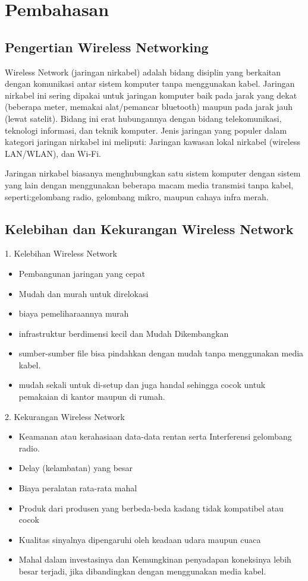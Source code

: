 \documentclass[conference]{IEEEtran}
\begin{document}
\section{Pembahasan}

\subsection{Pengertian Wireless Networking}
Wireless Network (jaringan nirkabel) adalah bidang disiplin yang berkaitan dengan komunikasi antar sistem komputer tanpa menggunakan kabel. Jaringan nirkabel ini sering dipakai untuk jaringan komputer baik pada jarak yang dekat (beberapa meter, memakai alat/pemancar bluetooth) maupun pada jarak jauh (lewat satelit). Bidang ini erat hubungannya dengan bidang telekomunikasi, teknologi informasi, dan teknik komputer. Jenis jaringan yang populer dalam kategori jaringan nirkabel ini meliputi: Jaringan kawasan lokal nirkabel (wireless LAN/WLAN), dan Wi-Fi.

Jaringan nirkabel biasanya menghubungkan satu sistem komputer dengan sistem yang lain dengan menggunakan beberapa macam media transmisi tanpa kabel, seperti:gelombang radio, gelombang mikro, maupun cahaya infra merah.

\subsection{Kelebihan dan Kekurangan Wireless Network}
1. Kelebihan Wireless Network
\begin{itemize}
    \item  Pembangunan jaringan yang cepat
    \item  Mudah dan murah untuk direlokasi
    \item  biaya pemeliharaannya murah
    \item  infrastruktur berdimensi kecil dan Mudah Dikembangkan
    \item  sumber-sumber file bisa pindahkan dengan   mudah tanpa menggunakan media kabel.
    \item mudah sekali untuk di-setup dan juga handal sehingga cocok untuk pemakaian di kantor maupun di rumah.
\end{itemize}
\vspace{0.1cm}

2. Kekurangan Wireless Network
\begin{itemize}
    \item Keamanan atau kerahasiaan data-data rentan serta Interferensi gelombang radio.
    \item Delay (kelambatan) yang besar
    \item Biaya peralatan rata-rata mahal
    \item Produk dari produsen yang berbeda-beda kadang tidak kompatibel atau cocok
    \item  Kualitas sinyalnya dipengaruhi oleh keadaan udara maupun cuaca
    \item Mahal dalam investasinya dan  Kemungkinan penyadapan koneksinya lebih besar terjadi, jika dibandingkan dengan menggunakan media kabel.
\end{itemize}
\end{document}
